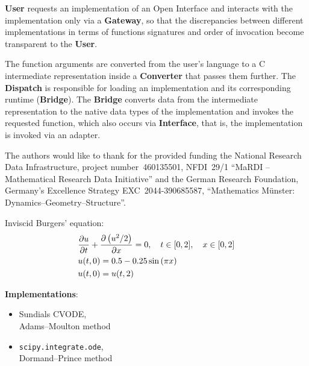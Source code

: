 \documentclass[a0paper, twocolumn, csc, english, final]{mpi2015_poster}
\begin{document}
\begin{poster}
\begin{pcolumn}
\begin{pbox}
      \textbf{User} requests an implementation of an Open Interface
      and interacts with the implementation only via a \textbf{Gateway},
      so that the discrepancies between different implementations in terms
      of functions signatures and order of invocation become transparent
      to the \textbf{User}.

      The function arguments are converted from the user's language
      to a C intermediate representation inside a \textbf{Converter}
      that passes them further.
      The \textbf{Dispatch} is responsible for loading an implementation
      and its corresponding runtime (\textbf{Bridge}).
      The \textbf{Bridge} converts data from the intermediate representation
      to the native data types of the implementation and invokes
      the requested function, which also occurs via \textbf{Interface},
      that is, the implementation is invoked via an adapter.
    \end{pbox}
    \begin{pbox}
      \large
      The authors would like to thank for the provided funding
      the National Research Data Infrastructure,
      project number~460135501, NFDI~29/1 “MaRDI – Mathematical
      Research Data Initiative”
      and
      the German Research Foundation,
      Germany's Excellence Strategy EXC~2044-390685587,
      ``Mathematics Münster: Dynamics--Geometry--Structure''.
    \end{pbox}
  \end{pcolumn}
  \begin{pcolumn}
    \begin{pbox}
      \large
      Inviscid Burgers' equation:
      \begin{align*}
         & \pdv{u}{t} + \pdv{\left( u^{2} / 2 \right)}{x} = 0,
        \quad t \in [0, 2], \quad x \in [0, 2]                 \\
         & u(t, 0) = 0.5 - 0.25 \sin \left( \pi x \right)      \\
         & u(t, 0) = u(t, 2)
      \end{align*}
      \begin{minipage}{\dimexpr0.46\columnwidth - 2\tabcolsep}
        \textbf{Implementations}:
        \begin{itemize}
          \item Sundials CVODE,\\Adams--Moulton method
          \item \texttt{scipy.integrate.ode},\\Dormand--Prince method

\end{itemize}
\end{minipage}
\end{pbox}
\end{pcolumn}
\end{poster}
\end{document}
